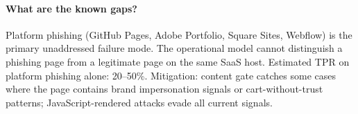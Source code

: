 \documentclass[11pt,a4paper]{article}
\begin{document}
\paragraph{What are the known gaps?}
Platform phishing (GitHub Pages, Adobe Portfolio, Square Sites,
Webflow) is the primary unaddressed failure mode. The operational
model cannot distinguish a phishing page from a legitimate page
on the same SaaS host. Estimated TPR on platform phishing alone:
20--50\%. Mitigation: content gate catches some cases where the
page contains brand impersonation signals or cart-without-trust
patterns; JavaScript-rendered attacks evade all current signals.
\end{document}
